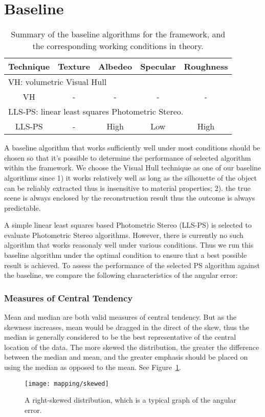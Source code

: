 \section{Baseline}
\begin{table}[!htbp]
\centering
\begin{tabular}{c|c|c|c|c}
\hline
Technique & Texture & Albedeo & Specular & Roughness\\
\hline\hline
\multicolumn{5}{l}{VH: volumetric Visual Hull}\\
\hline
VH & - & - & - & -\\
\hline\hline
\multicolumn{5}{l}{LLS-PS: linear least squares Photometric Stereo.}\\
\hline
LLS-PS & - & High & Low & High\\
\hline
\end{tabular}
\caption{Summary of the baseline algorithms for the framework, and the corresponding working conditions in theory.}
\label{tab:selected_baseline_algos}
\end{table}
A baseline algorithm that works sufficiently well under most conditions should be chosen so that it's possible to determine the performance of selected algorithm within the framework. We choose the Visual Hull technique as one of our baseline algorithms since 1) it works relatively well as long as the silhouette of the object can be reliably extracted thus is insensitive to material properties; 2). the true scene is always enclosed by the reconstruction result thus the outcome is always predictable.

A simple linear least squares based Photometric Stereo (LLS-PS) is selected to evaluate Photometric Stereo algorithms. However, there is currently no such algorithm that works reasonaly well under various conditions. Thus we run this baseline algorithm under the optimal condition to ensure that a best possible result is achieved. To assess the performance of the selected PS algorithm against the baseline, we compare the following characteristics of the angular error:

\subsubsection{Measures of Central Tendency}
Mean and median are both valid measures of central tendency. But as the skewness increases, mean would be dragged in the direct of the skew, thus the median is generally considered to be the best representative of the central location of the data. The more skewed the distribution, the greater the difference between the median and mean, and the greater emphasis should be placed on using the median as opposed to the mean. See Figure~\ref{fig:ang_diff_skew}.
\begin{figure}[!htbp]
\centering
\texttt{[image: mapping/skewed]}
\caption{A right-skewed distribution, which is a typical graph of the angular error.}
\label{fig:ang_diff_skew}
\end{figure}

